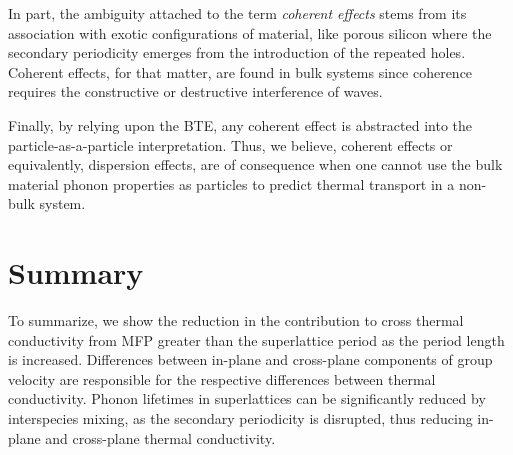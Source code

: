 \documentclass[aps,prb,preprint,preprintnumbers,amsmath,amssymb,floatfix,superscriptaddress]{revtex4}
\begin{document}
In part, the ambiguity attached to the term \textit {coherent effects} stems from its association with exotic configurations of material, like porous silicon \cite{doi:10.1021/nl102918q} \cite{} where the secondary periodicity emerges from the introduction of the repeated holes. Coherent effects, for that matter, are found in bulk systems since coherence requires the constructive or destructive interference of waves.

Finally, by relying upon the BTE, any coherent effect is abstracted into the particle-as-a-particle interpretation. Thus, we believe, coherent effects or equivalently, dispersion effects, are of consequence when one cannot use the bulk material phonon properties as particles to predict thermal transport in a non-bulk system.

\section{Summary}

To summarize, we show the reduction in the contribution to cross thermal conductivity from MFP greater than the superlattice period as the period length is increased. Differences between in-plane and cross-plane components of group velocity are responsible for the respective differences between thermal conductivity. Phonon lifetimes in superlattices can be significantly reduced by interspecies mixing, as the secondary periodicity is disrupted, thus reducing in-plane and cross-plane thermal conductivity. 

\newpage
%

\end{document}
